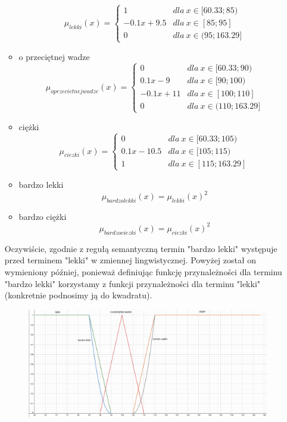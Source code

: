 \documentclass{classrep}
\begin{document}
\begin{enumerate}
\begin{itemize}
\begin{equation}
            \mu_{lekki}(x) = \left\{\begin{matrix} 1 & dla \: x\in[60.33;85) \\ -0.1x + 9.5 & dla \: x\in [85; 95] \\ 0 & dla \: x\in (95; 163.29] \end{matrix}\right.
        \end{equation}
         \item o przeciętnej wadze
        \begin{equation}
            \mu_{oprzecietnejwadze}(x) = \left\{\begin{matrix} 0 & dla \: x\in [60.33; 90) \\ 0.1x - 9 & dla \: x\in[90;100) \\ -0.1x + 11 & dla \: x\in [100; 110] \\ 0 & dla \: x\in (110; 163.29]\end{matrix}\right.
        \end{equation}
        \item ciężki
        \begin{equation}
            \mu_{ciezki}(x) = \left\{\begin{matrix} 0 & dla \: x\in [60.33; 105) \\ 0.1x - 10.5 & dla \: x\in[105;115) \\ 1 & dla \: x\in [115; 163.29] \end{matrix}\right.
        \end{equation}
        \item bardzo lekki
        \begin{equation}
            \mu_{bardzolekki}(x) = \mu_{lekki}(x)^2
        \end{equation}
        \item bardzo ciężki
        \begin{equation}
            \mu_{bardzociezki}(x) = \mu_{ciezki}(x)^2
        \end{equation}
    \end{itemize}
    Oczywiście, zgodnie z regułą semantyczną termin "bardzo lekki" występuje przed terminem "lekki" w zmiennej lingwistycznej. Powyżej został on wymieniony później, ponieważ definiując funkcję przynależności dla terminu "bardzo lekki" korzystamy z funkcji przynależności dla terminu "lekki" (konkretnie podnosimy ją do kwadratu).
    \begin{figure}[H]
        \centering
        \includegraphics[width=14cm]{wykres_waga.png}

\end{figure}
\end{enumerate}
\end{document}

